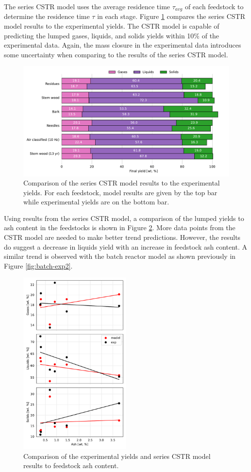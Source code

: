 The series CSTR model uses the average residence time $\tau_{avg}$ of each feedstock to determine the residence time $\tau$ in each stage. Figure \ref{fig:cstr-exp1} compares the series CSTR model results to the experimental yields. The CSTR model is capable of predicting the lumped gases, liquids, and solids yields within 10\% of the experimental data. Again, the mass closure in the experimental data introduces some uncertainty when comparing to the results of the series CSTR model.

\begin{figure}[H]
    \centering
    \includegraphics[width=\textwidth]{figures/cstr-exp1.pdf}
    \caption{Comparison of the series CSTR model results to the experimental yields. For each feedstock, model results are given by the top bar while experimental yields are on the bottom bar.}
    \label{fig:cstr-exp1}
\end{figure}

Using results from the series CSTR model, a comparison of the lumped yields to ash content in the feedstocks is shown in Figure \ref{fig:cstr-exp2}. More data points from the CSTR model are needed to make better trend predictions. However, the results do suggest a decrease in liquids yield with an increase in feedstock ash content. A similar trend is observed with the batch reactor model as shown previously in Figure \ref{fig:batch-exp2}.

\begin{figure}[H]
    \centering
    \includegraphics[width=0.5\textwidth]{figures/cstr-exp2.pdf}
    \caption{Comparison of the experimental yields and series CSTR model results to feedstock ash content.}
    \label{fig:cstr-exp2}
\end{figure}
